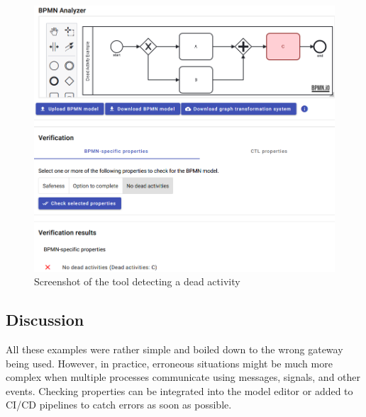 \documentclass[runningheads]{llncs}
\begin{document}
\begin{figure}[ht]
    \centering
    \includegraphics[width=1\textwidth]{artifacts/dead_sample.png}
    \caption{Screenshot of the tool detecting a dead activity}
    \label{fig:deadSample}
\end{figure}


\subsection{Discussion}

All these examples were rather simple and boiled down to the wrong gateway being used.
However, in practice, erroneous situations might be much more complex when multiple processes communicate using messages, signals, and other events.
Checking properties can be integrated into the model editor or added to CI/CD pipelines to catch errors as soon as possible.
\end{document}

